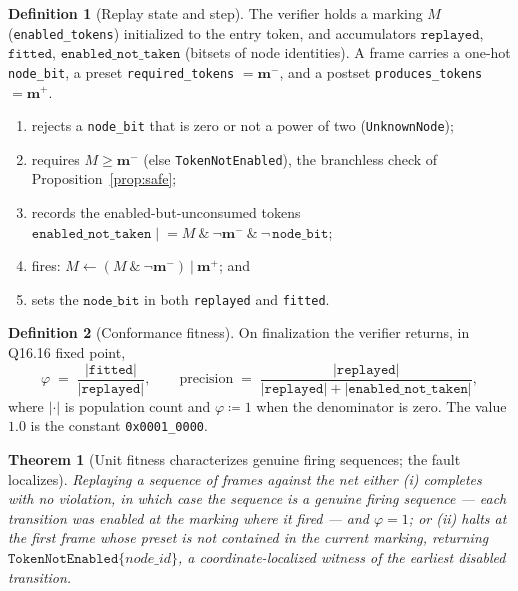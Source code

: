\documentclass[11pt,oneside]{book}
\theoremstyle{definition}
\newtheorem{definition}{Definition}[chapter]
\theoremstyle{plain}
\newtheorem{theorem}{Theorem}[chapter]
\theoremstyle{remark}
\newcommand{\Fitness}{\varphi}
\newcommand{\preset}{\mathbf{m}^{-}}
\newcommand{\postset}{\mathbf{m}^{+}}
\newcommand{\code}[1]{\texttt{#1}}
\begin{document}
\begin{definition}[Replay state and step]\label{def:replay}
The verifier holds a marking $M$ (\code{enabled\_tokens}) initialized to the entry token,%
and accumulators $\code{replayed}$, $\code{fitted}$, $\code{enabled\_not\_taken}$ (bitsets of
node identities). A frame carries a one-hot \code{node\_bit}, a preset \code{required\_tokens}
$=\preset$, and a postset \code{produces\_tokens} $=\postset$.%
\begin{enumerate}[label=(\arabic*),leftmargin=*]
\item rejects a \code{node\_bit} that is zero or not a power of two (\code{UnknownNode});
\item requires $M\ge\preset$ (else \code{TokenNotEnabled}), the branchless check of
      Proposition~\ref{prop:safe};%
\item records the enabled-but-unconsumed tokens
      $\code{enabled\_not\_taken}\mathrel{|}= M\ \&\ \lnot\preset\ \&\ \lnot\,\code{node\_bit}$;%
\item fires: $M\gets(M\ \&\ \lnot\preset)\ |\ \postset$; and%
\item sets the $\code{node\_bit}$ in both \code{replayed} and \code{fitted}.
\end{enumerate}
\end{definition}

\begin{definition}[Conformance fitness]\label{def:fitness}
On finalization the verifier returns, in Q16.16 fixed point,
\[
\Fitness \;=\; \frac{|\code{fitted}|}{|\code{replayed}|},\qquad
\text{precision}\;=\;\frac{|\code{replayed}|}{|\code{replayed}|+|\code{enabled\_not\_taken}|},
\]
where $|\cdot|$ is population count and $\Fitness\coloneqq 1$ when the denominator is zero. The
value $1.0$ is the constant \code{0x0001\_0000}.
\end{definition}

\begin{theorem}[Unit fitness characterizes genuine firing sequences; the fault localizes]\label{thm:fitness}
Replaying a sequence of frames against the net either (i) completes with no violation, in which
case the sequence is a genuine firing sequence --- each transition was enabled at the marking
where it fired --- and $\Fitness=1$; or (ii) halts at the first frame whose preset is not
contained in the current marking, returning $\code{TokenNotEnabled}\{node\_id\}$, a
coordinate-localized witness of the earliest disabled transition.
\end{theorem}
\end{document}
